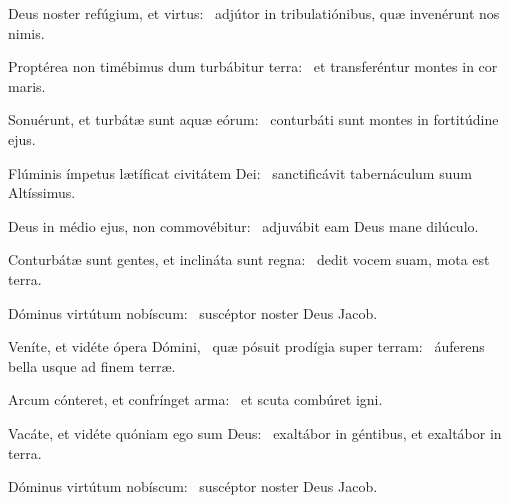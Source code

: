 \item Deus noster refúgium, et virtus:~\psstar{} adjútor in tribulatiónibus, quæ invenérunt nos nimis.

\item Proptérea non timébimus dum turbábitur terra:~\psstar{} et transferéntur montes in cor maris.

\item Sonuérunt, et turbátæ sunt aquæ eórum:~\psstar{} conturbáti sunt montes in fortitúdine ejus.

\item Flúminis ímpetus lætíficat civitátem Dei:~\psstar{} sanctificávit tabernáculum suum Altíssimus.

\item Deus in médio ejus, non commovébitur:~\psstar{} adjuvábit eam Deus mane dilúculo.

\item Conturbátæ sunt gentes, et inclináta sunt regna:~\psstar{} dedit vocem suam, mota est terra.

\item Dóminus virtútum nobís\-cum:~\psstar{} suscéptor noster Deus Jacob.

\item Veníte, et vidéte ópera Dómini,~\pscross{} quæ pósuit prodígia super terram:~\psstar{} áuferens bella usque ad finem terræ.

\item Arcum cónteret, et confrínget arma:~\psstar{} et scuta combúret igni.

\item Vacáte, et vidéte quóniam ego sum Deus:~\psstar{} exaltábor in géntibus, et exaltábor in terra.

\item Dóminus virtútum nobís\-cum:~\psstar{} suscéptor noster Deus Jacob.
